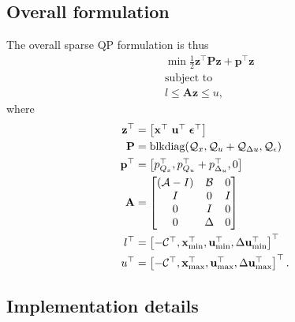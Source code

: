 \documentclass[a4paper,12pt,fleqn]{article}
\newcommand{\lQP}{l}
\newcommand{\uQP}{u}
\newcommand{\AQP}{\mathbf{A}}
\newcommand{\PQP}{\mathbf{P}}
\newcommand{\qQP}{\mathbf{p}}
\newcommand{\xQP}{\mathbf{z}}
\newcommand{\varepsvec}{\bm{\epsilon}}
\newcommand{\varxvec}{\mathbf{x}}
\newcommand{\varuvec}{\mathbf{u}}
\newcommand{\slack}{\epsilon}
\newcommand{\blkdiag}{\text{blkdiag}}
\begin{document}
\subsection{Overall formulation}
The overall sparse QP formulation is thus%
\begin{subequations}
\begin{align}
 &\min \frac{1}{2} \xQP^\top \PQP \xQP +  \qQP^\top \xQP \\
 &\text{subject to} \nonumber \\
 &\lQP \leq \AQP \xQP \leq \uQP,
\end{align}
\end{subequations}
where 
\begin{subequations}
\begin{align}
\xQP^\top &= \begin{bmatrix}\varxvec^\top \; \varuvec^\top\; \varepsvec^\top \end{bmatrix}\\
\PQP &= \blkdiag(\mathcal{Q}_x, \mathcal{Q}_u + \mathcal{Q}_{\Delta u}, \mathcal{Q}_\slack) \\
\qQP^\top &= \begin{bmatrix}p_{Q_x}^\top, p_{Q_u}^\top + p_{\Delta_u}^\top, 0 \end{bmatrix} \label{pQPsparse} \\
\AQP  &=  
 \begin{bmatrix}
  (\mathcal{A}-I) & \mathcal{B} & 0 \\
  I & 0 & I\\
  0 & I & 0\\
  0 & \Delta & 0 \label{eq:AQPsparse}\\
 \end{bmatrix}\\
\lQP^\top &= \begin{bmatrix}-\mathcal{C}^\top, \varxvec_{\min}^\top, \varuvec_{\min}^\top, \Delta{\varuvec}_{\rm min}^\top \end{bmatrix}^\top \label{lQPsparse}\\
\uQP^\top &= \begin{bmatrix}-\mathcal{C}^\top, \varxvec_{\max}^\top, \varuvec_{\max}^\top, \Delta{\varuvec}_{\rm max}^\top \end{bmatrix}^\top \label{uQPsparse}.
\end{align}
\end{subequations}

\subsection{Implementation details}
\end{document}
